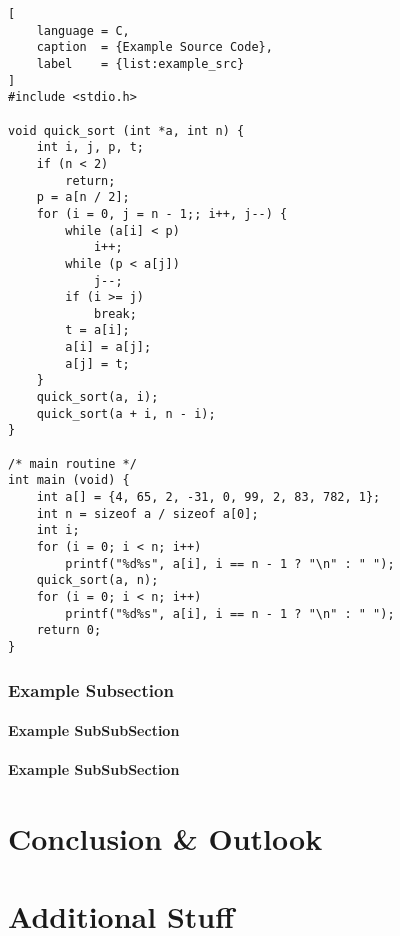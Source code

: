 \documentclass[%
]{tumDiss}
\begin{document}
\begin{lstlisting}[
    language = C,
    caption  = {Example Source Code},
    label    = {list:example_src}
]
#include <stdio.h>

void quick_sort (int *a, int n) {
    int i, j, p, t;
    if (n < 2)
        return;
    p = a[n / 2];
    for (i = 0, j = n - 1;; i++, j--) {
        while (a[i] < p)
            i++;
        while (p < a[j])
            j--;
        if (i >= j)
            break;
        t = a[i];
        a[i] = a[j];
        a[j] = t;
    }
    quick_sort(a, i);
    quick_sort(a + i, n - i);
}

/* main routine */
int main (void) {
    int a[] = {4, 65, 2, -31, 0, 99, 2, 83, 782, 1};
    int n = sizeof a / sizeof a[0];
    int i;
    for (i = 0; i < n; i++)
        printf("%d%s", a[i], i == n - 1 ? "\n" : " ");
    quick_sort(a, n);
    for (i = 0; i < n; i++)
        printf("%d%s", a[i], i == n - 1 ? "\n" : " ");
    return 0;
}
\end{lstlisting}



\subsection{Example Subsection}

\lipsum[1]



\subsubsection{Example SubSubSection}

\lipsum[9]



\subsubsection{Example SubSubSection}

\lipsum[10]



\chapter{Conclusion \& Outlook}
\label{chap:conclusion}

\lipsum[1-4]








\appendix
\chapter{Additional Stuff}

\lipsum[1-4]
\end{document}
